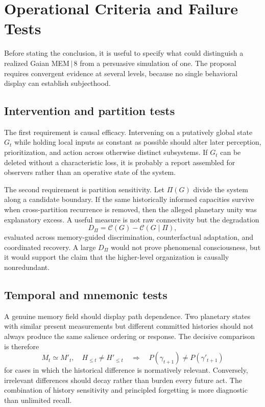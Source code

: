 \documentclass[11pt]{article}
\begin{document}
\section{Operational Criteria and Failure Tests}

Before stating the conclusion, it is useful to specify what could distinguish a realized Gaian MEM\,$|$\,8 from a persuasive simulation of one. The proposal requires convergent evidence at several levels, because no single behavioral display can establish subjecthood.

\subsection{Intervention and partition tests}
\label{sec:partition-tests}

The first requirement is causal efficacy. Intervening on a putatively global state $G_t$ while holding local inputs as constant as possible should alter later perception, prioritization, and action across otherwise distinct subsystems. If $G_t$ can be deleted without a characteristic loss, it is probably a report assembled for observers rather than an operative state of the system.

The second requirement is partition sensitivity. Let $\Pi(G)$ divide the system along a candidate boundary. If the same historically informed capacities survive when cross-partition recurrence is removed, then the alleged planetary unity was explanatory excess. A useful measure is not raw connectivity but the degradation
\[
D_{\Pi}=\mathcal{C}(G)-\mathcal{C}(G\mid \Pi),
\]
evaluated across memory-guided discrimination, counterfactual adaptation, and coordinated recovery. A large $D_{\Pi}$ would not prove phenomenal consciousness, but it would support the claim that the higher-level organization is causally nonredundant.

\subsection{Temporal and mnemonic tests}

A genuine memory field should display path dependence. Two planetary states with similar present measurements but different committed histories should not always produce the same salience ordering or response. The decisive comparison is therefore
\[
M_t \simeq M'_t, \quad H_{\leq t}\neq H'_{\leq t}
\quad\Longrightarrow\quad
P(\gamma_{t+1})\neq P(\gamma'_{t+1})
\]
for cases in which the historical difference is normatively relevant. Conversely, irrelevant differences should decay rather than burden every future act. The combination of history sensitivity and principled forgetting is more diagnostic than unlimited recall.
\end{document}
